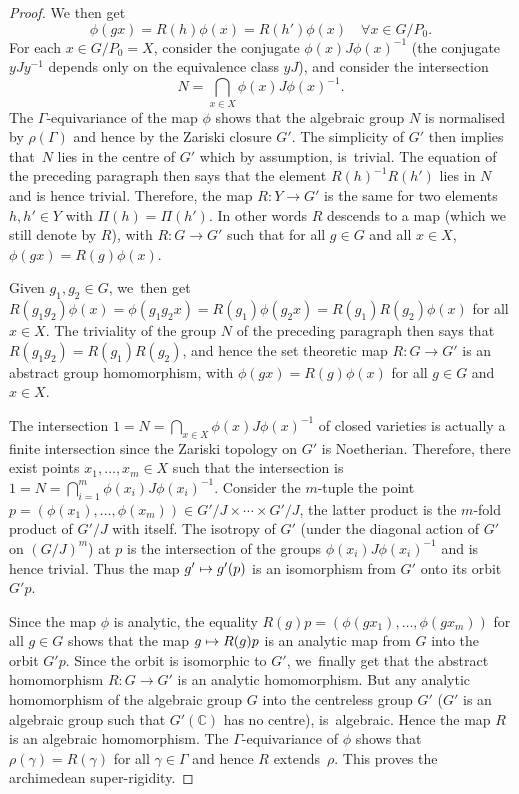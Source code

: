 \documentclass[JEP,XML,SOM,Unicode,published]{cedram}
\def\mto{\mathchoice{\longmapsto}{\mapsto}{\mapsto}{\mapsto}}
\theoremstyle{definition}
\newcommand{\field}[1]{\mathbb{#1}}
\newcommand{\C}{\field{C}}
\let\g\gamma
\let\G\Gamma
\begin{document}
\begin{proof}
We then get
\[
\phi (gx)=R(h)\phi (x)=R(h')\phi (x) \quad \forall x\in G/P_0.
\]
For each $x\in G/P_0=X$, consider the conjugate $\phi (x)J\phi (x)^{-1}$ (the conjugate $yJy^{-1}$ depends only on the equivalence class $yJ$), and consider the intersection
\[
N=\bigcap_{x\in X} \phi (x)J\phi (x)^{-1}.
\]
The $\G$-equivariance of the map $\phi$ shows that the algebraic group $N$ is normalised by $\rho (\G)$ and hence by the Zariski closure $G'$. The simplicity of $G'$ then implies that~$N$ lies in the centre of $G'$ which by assumption, is~trivial.
The equation of the preceding paragraph then says that the element $R(h) ^{-1}R(h')$ lies in $N$ and is hence trivial. Therefore, the map $R:Y \to G'$ is the same for two elements $h,h' \in Y$ with $\Pi (h)=\Pi (h')$. In other words $R$ descends to a map (which we still denote by $R$), with \hbox{$R: G\to G'$} such that for all $g\in G$ and all $x\in X$, $\phi (gx)=R(g)\phi (x)$.

Given $g_1,g_2 \in G$, we~then get $R(g_1g_2)\phi (x)= \phi (g_1g_2x)=R(g_1)\phi (g_2x)= R(g_1)R(g_2)\phi (x)$ for all $x\in X$. The triviality of the group $N$ of the preceding paragraph then says that $R(g_1g_2)=R(g_1)R(g_2)$, and hence the set theoretic map $R:G \to G'$ is an abstract group homomorphism, with $\phi (gx)=R(g)\phi (x)$ for all $g\in G$ and $x\in X$.

The intersection $1= N=\bigcap_{x\in X} \phi (x)J\phi (x)^{-1}$ of closed varieties is actually a finite intersection since the Zariski topology on $G'$ is Noetherian. Therefore, there exist points $x_1,\dots, x_m \in X$ such that the intersection is
$1= N=\bigcap_{i=1}^m \phi (x_i)J\phi (x_i)^{-1}$. Consider the $m$-tuple \ie the point $p=(\phi (x_1),\dots, \phi (x_m))\in G'/J \times \cdots \times G'/J$, the latter product is the $m$-fold product of $G'/J$ with itself. The isotropy of $G'$ (under the diagonal action of $G'$ on $(G/J)^m$) at $p$ is the intersection of the groups $\phi (x_i)J\phi (x_i)^{-1}$ and is hence trivial. Thus the map $g'\mto g'(p)$ is an isomorphism from $G'$ onto its orbit $G'p$.

Since the map $\phi$ is analytic, the equality $R(g)p= (\phi (gx_1),\dots, \phi (gx_m))$ for all $g\in G$ shows that the map $g\mto R(g)p$ is an analytic map from $G$ into the orbit $G'p$. Since the orbit is isomorphic to $G'$, we~finally get that the abstract homomorphism $R: G\to G'$ is an analytic homomorphism. But any analytic homomorphism of the algebraic group $G$ into the centreless group $G'$ (\ie $G'$ is an algebraic group such that $G'(\C)$ has no centre), is~algebraic. Hence the map $R$ is an algebraic homomorphism. The $\G$-equivariance of $\phi$ shows that $\rho (\g)=R(\g)$ for all $\g \in \G$ and hence $R$ extends~$\rho$. This proves the archimedean super-rigidity.
\end{proof}
\end{document}
